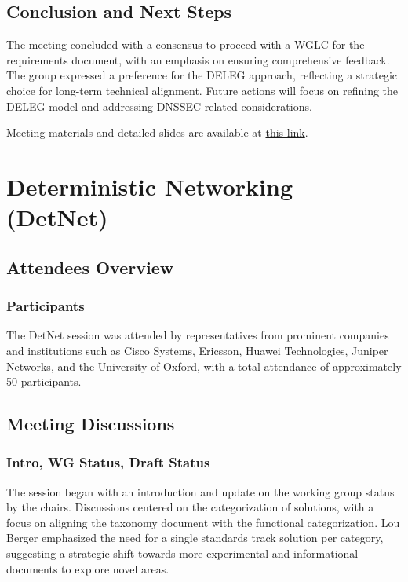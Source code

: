 \documentclass{article}
\begin{document}
\subsection{Conclusion and Next Steps}
The meeting concluded with a consensus to proceed with a WGLC for the requirements document, with an emphasis on ensuring comprehensive feedback. The group expressed a preference for the DELEG approach, reflecting a strategic choice for long-term technical alignment. Future actions will focus on refining the DELEG model and addressing DNSSEC-related considerations.

Meeting materials and detailed slides are available at \href{https://datatracker.ietf.org/meeting/121/materials/slides-121-deleg-comparison-draft-wesplaap-deleg-01-vs-draft-homburg-deleg-incremental-deleg-00-00}{this link}.



\newpage

\section{Deterministic Networking (DetNet)}

\subsection{Attendees Overview}
\subsubsection{Participants}
The DetNet session was attended by representatives from prominent companies and institutions such as Cisco Systems, Ericsson, Huawei Technologies, Juniper Networks, and the University of Oxford, with a total attendance of approximately 50 participants.

\subsection{Meeting Discussions}

\subsubsection{Intro, WG Status, Draft Status}
The session began with an introduction and update on the working group status by the chairs. Discussions centered on the categorization of solutions, with a focus on aligning the taxonomy document with the functional categorization. Lou Berger emphasized the need for a single standards track solution per category, suggesting a strategic shift towards more experimental and informational documents to explore novel areas.
\end{document}
